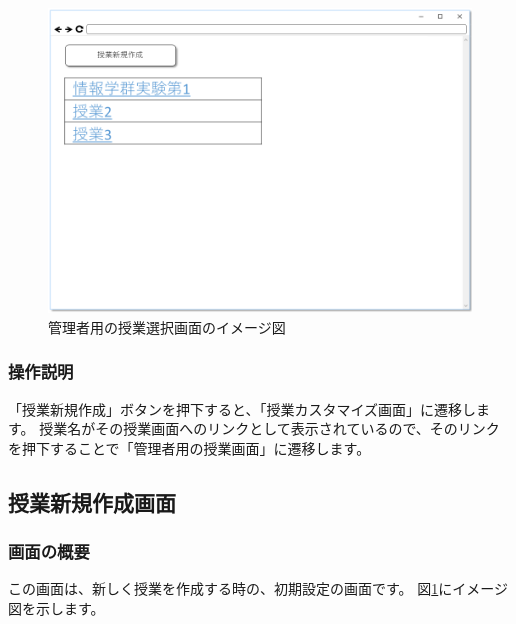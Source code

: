 \begin{figure}[htbp]
  \begin{center}
    \includegraphics[width=1\linewidth,clip]{./img/sc_select_class.png}
    \caption{管理者用の授業選択画面のイメージ図}\label{fig:sc_select_class}
  \end{center}
\end{figure}

\subsubsection{操作説明}
「授業新規作成」ボタンを押下すると、「授業カスタマイズ画面」に遷移します。
授業名がその授業画面へのリンクとして表示されているので、そのリンクを押下することで「管理者用の授業画面」に遷移します。

\subsection{授業新規作成画面}
\subsubsection{画面の概要}
この画面は、新しく授業を作成する時の、初期設定の画面です。
図\ref{fig:sc_select_class}にイメージ図を示します。

